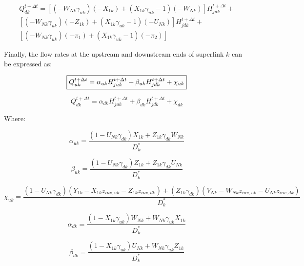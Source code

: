 \documentclass[11pt]{article}
\begin{document}
\begin{equation}
  \begin{split}
    Q_{dk}^{t + \Delta t} = 
    [(-W_{Nk} \gamma_{uk})(-X_{1k}) + (X_{1k} \gamma_{uk} - 1)(-W_{Nk})] H_{juk}^{t + \Delta t} + \\
    [(-W_{Nk} \gamma_{uk})(-Z_{1k}) + (X_{1k} \gamma_{uk} - 1)(-U_{Nk})] H_{jdk}^{t + \Delta t} + \\
    [(-W_{Nk} \gamma_{uk})(- \pi_1) + (X_{1k} \gamma_{uk} - 1)(-\pi_2)]
  \end{split}
\end{equation}

Finally, the flow rates at the upstream and downstream ends of superlink $k$ can be expressed as:

\begin{equation}
  \boxed{
 Q_{uk}^{t + \Delta t} = \alpha_{uk} H_{juk}^{t + \Delta t} + \beta_{uk} H_{jdk}^{t + \Delta t} + \chi_{uk} \\ 
 }
\end{equation}

\begin{equation}
  \boxed{
 Q_{dk}^{t + \Delta t} = \alpha_{dk} H_{juk}^{t + \Delta t} + \beta_{dk} H_{jdk}^{t + \Delta t} + \chi_{dk} 
 }
\end{equation}

Where:

\begin{equation}
  \boxed{
  \alpha_{uk} = \frac{(1 - U_{Nk} \gamma_{dk}) X_{1k} + Z_{1k} \gamma_{dk} W_{Nk}}{D_k^*}
  }
\end{equation}

\begin{equation}
  \boxed{
  \beta_{uk} = \frac{(1 - U_{Nk} \gamma_{dk}) Z_{1k} + Z_{1k} \gamma_{dk} U_{Nk}}{D_k^*}
  }
\end{equation}

\begin{equation}
  \boxed{
  \chi_{uk} = \frac{(1 - U_{Nk} \gamma_{dk})(Y_{1k} - X_{1k} z_{inv, uk} - Z_{1k} z_{inv, dk})  + (Z_{1k} \gamma_{dk})(V_{Nk} - W_{Nk} z_{inv, uk} - U_{Nk} z_{inv, dk})}{D_k^*}
  }
\end{equation}

\begin{equation}
  \boxed{
  \alpha_{dk} = \frac{(1 - X_{1k} \gamma_{uk}) W_{Nk} + W_{Nk} \gamma_{uk} X_{1k}}{D_k^*}
  }
\end{equation}

\begin{equation}
  \boxed{
  \beta_{dk} = \frac{(1 - X_{1k} \gamma_{uk}) U_{Nk} + W_{Nk} \gamma_{uk} Z_{1k}}{D_k^*}
  }
\end{equation}
\end{document}
